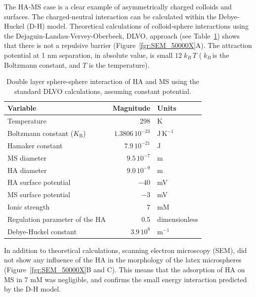 \documentclass[journal=langd5,manuscript=article]{achemso}
\begin{document}
The HA-MS case is a clear example of asymmetrically charged colloids and surfaces. The charged-neutral interaction can be calculated within the Debye-Huckel (D-H) model. Theoretical calculations of colloid-sphere interactions using the Dejaguin-Landau-Vervey-Oberbeek, DLVO, approach (see Table~\ref{tbl:dvlo_interaction}) shows that there is not a repulsive barrier (Figure~\ref{fgr:SEM_50000X}A). The attraction potential at 1 nm separation, in absolute value,  is small $12\;k_B\,T$ ($\;k_B\,$is the Boltzmann constant, and $T$ is the temperature). 


\begin{table}
\caption{Double layer sphere-sphere interaction  of HA and MS using the standard DLVO calculations, assuming constant potential.}
\label{tbl:dvlo_interaction}
\begin{tabular}{lrl}
Variable & Magnitude & Units\\
\hline
Temperature & 298 & K\\
Boltzmann constant ($K_\mathrm{B}$) & $1.3806\,10^{-23}$ & $\mathrm{J\, K^{-1}}$\\
Hamaker constant & $7.9\,10^{-21}$ & J\cite{Fronczak2017}\\
MS  diameter & $9.5\, 10^{-7}$ & m\\
HA  diameter & $9.0\, 10^{-9}$ & m\\
HA surface potential & $-40$ & mV\cite{Rodrigues2009}\\
MS surface potential & $-3$ & mV\cite{Kotera1970}\\
Ionic strength & $7$ & mM \\
Regulation parameter of the HA & 0.5 & dimensionless\cite{Ruiz-Cabello2013,Trefalt2014}\\
Debye-Huckel constant & $3.9\,10^8$ & $\mathrm{m^{-1}}$\\
\hline
\end{tabular}
\end{table}

In addition to theoretical calculations, scanning electron microscopy (SEM), did not show any influence of the HA in the morphology of the latex microspheres (Figure~\ref{fgr:SEM_50000X}B and C). This means that the adsorption of HA on MS in 7 mM  was negligible, and confirms the small energy interaction predicted by the D-H model.
\end{document}

